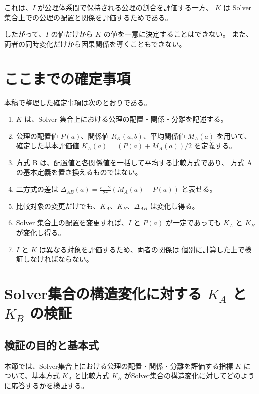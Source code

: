 \documentclass[a4paper,11pt]{ltjsarticle}
\begin{document}
これは、$I$ が公理体系間で保持される公理の割合を評価する一方、
$K$ は Solver 集合上での公理の配置と関係を評価するためである。

したがって、$I$ の値だけから $K$ の値を一意に決定することはできない。
また、両者の同時変化だけから因果関係を導くこともできない。

\section{ここまでの確定事項}

本稿で整理した確定事項は次のとおりである。

\begin{enumerate}
  \item $K$ は、Solver 集合上における公理の配置・関係・分離を記述する。
  \item 公理の配置値 $P(a)$、関係値 $R_K(a,b)$、平均関係値 $M_A(a)$
        を用いて、確定した基本評価値
        $K_A(a)=(P(a)+M_A(a))/2$ を定義する。
  \item 方式 B は、配置値と各関係値を一括して平均する比較方式であり、
        方式 A の基本定義を置き換えるものではない。
  \item 二方式の差は
        $\Delta_{AB}(a)=\frac{r-2}{2r}(M_A(a)-P(a))$
        と表せる。
  \item 比較対象の変更だけでも、$K_A$、$K_B$、$\Delta_{AB}$ は変化し得る。
  \item Solver 集合上の配置を変更すれば、$I$ と $P(a)$ が一定であっても
        $K_A$ と $K_B$ が変化し得る。
  \item $I$ と $K$ は異なる対象を評価するため、両者の関係は
        個別に計算した上で検証しなければならない。
\end{enumerate}









\section{Solver集合の構造変化に対する $K_A$ と $K_B$ の検証}
\label{sec:K-structural-verification}

\subsection{検証の目的と基本式}

本節では、Solver集合上における公理の配置・関係・分離を評価する指標 $K$ について、基本方式 $K_A$ と比較方式 $K_B$ がSolver集合の構造変化に対してどのように応答するかを検証する。
\end{document}
